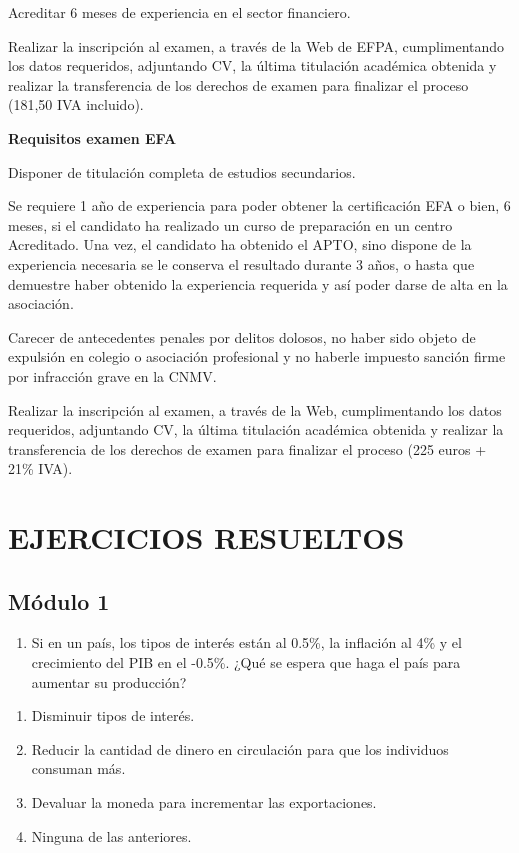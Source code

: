 \documentclass[
  letterpaper,
  DIV=11,
  numbers=noendperiod]{scrreprt}
\providecommand{\tightlist}{%
  \setlength{\itemsep}{0pt}\setlength{\parskip}{0pt}}\usepackage{longtable,booktabs,array}
\begin{document}
Acreditar 6 meses de experiencia en el sector financiero.

Realizar la inscripción al examen, a través de la Web de EFPA,
cumplimentando los datos requeridos, adjuntando CV, la última titulación
académica obtenida y realizar la transferencia de los derechos de examen
para finalizar el proceso (181,50 IVA incluido).

\textbf{Requisitos examen EFA}

Disponer de titulación completa de estudios secundarios.

Se requiere 1 año de experiencia para poder obtener la certificación EFA
o bien, 6 meses, si el candidato ha realizado un curso de preparación en
un centro Acreditado. Una vez, el candidato ha obtenido el APTO, sino
dispone de la experiencia necesaria se le conserva el resultado durante
3 años, o hasta que demuestre haber obtenido la experiencia requerida y
así poder darse de alta en la asociación.

Carecer de antecedentes penales por delitos dolosos, no haber sido
objeto de expulsión en colegio o asociación profesional y no haberle
impuesto sanción firme por infracción grave en la CNMV.

Realizar la inscripción al examen, a través de la Web, cumplimentando
los datos requeridos, adjuntando CV, la última titulación académica
obtenida y realizar la transferencia de los derechos de examen para
finalizar el proceso (225 euros + 21\% IVA).

\part{EJERCICIOS RESUELTOS}

\hypertarget{muxf3dulo-1}{%
\chapter*{Módulo 1}\label{muxf3dulo-1}}


\begin{enumerate}
\def\labelenumi{\arabic{enumi}.}
\tightlist
\item
  Si en un país, los tipos de interés están al 0.5\%, la inflación al
  4\% y el crecimiento del PIB en el -0.5\%. ¿Qué se espera que haga el
  país para aumentar su producción?
\end{enumerate}

\begin{enumerate}
\def\labelenumi{\alph{enumi})}
\item
  Disminuir tipos de interés.
\item
  Reducir la cantidad de dinero en circulación para que los individuos
  consuman más.
\item
  Devaluar la moneda para incrementar las exportaciones.
\item
  Ninguna de las anteriores.
\end{enumerate}
\end{document}
